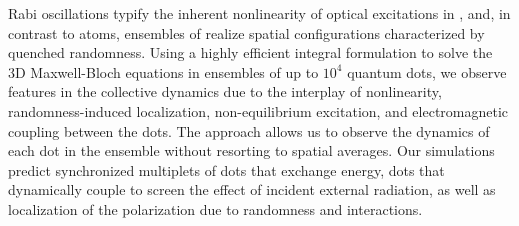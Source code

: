 Rabi oscillations typify the inherent nonlinearity of optical excitations in \qds{}, and, in contrast to atoms, ensembles of \qds{} realize spatial configurations characterized by quenched randomness.
Using a highly efficient integral formulation to solve the 3D Maxwell-Bloch equations in ensembles of up to $10^4$ quantum dots, we observe features in the collective dynamics due to the interplay of nonlinearity, randomness-induced localization, non-equilibrium excitation, and electromagnetic coupling between the dots.
The approach allows us to observe the dynamics of each dot in the ensemble without resorting to spatial averages.
Our simulations predict synchronized multiplets of dots that exchange energy, dots that dynamically couple to screen the effect of incident external radiation, as well as localization of the polarization due to randomness and interactions.
